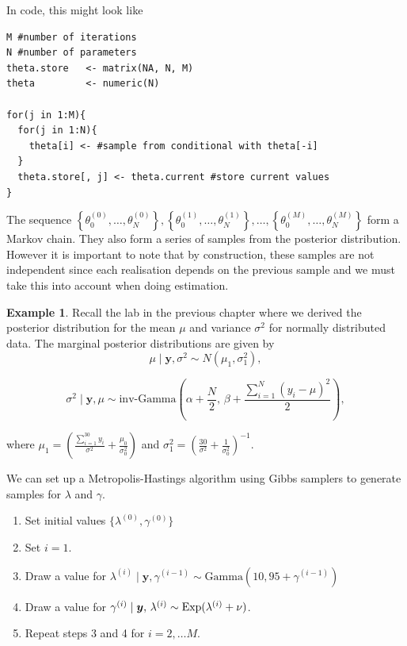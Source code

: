 \documentclass[
]{book}
\theoremstyle{definition}
\theoremstyle{definition}
\newtheorem{example}{Example}[chapter]
\theoremstyle{definition}
\theoremstyle{definition}
\theoremstyle{remark}
\begin{document}
In code, this might look like

\begin{verbatim}
M #number of iterations
N #number of parameters
theta.store   <- matrix(NA, N, M)
theta         <- numeric(N)

for(j in 1:M){
  for(j in 1:N){
    theta[i] <- #sample from conditional with theta[-i]
  }
  theta.store[, j] <- theta.current #store current values
}
\end{verbatim}

The sequence \(\left\{\theta_0^{(0)},\ldots, \theta_N^{(0)}\right\}, \left\{\theta_0^{(1)},\ldots, \theta_N^{(1)}\right\}, \ldots, \left\{\theta_0^{(M)},\ldots, \theta_N^{(M)}\right\}\) form a Markov chain. They also form a series of samples from the posterior distribution. However it is important to note that by construction, these samples are not independent since each realisation depends on the previous sample and we must take this into account when doing estimation.

\begin{example}

Recall the lab in the previous chapter where we derived the posterior distribution for the mean \(\mu\) and variance \(\sigma^2\) for normally distributed data. The marginal posterior distributions are given by
\[
\mu \mid \boldsymbol{y}, \sigma^2 \sim N(\mu_1, \sigma^2_1),
\]

\[
\sigma^2 \mid \boldsymbol{y}, \mu \sim \textrm{inv-Gamma}\left(\alpha + \frac{N}{2}, \,\beta + \frac{\sum_{i=1}^N (y_i - \mu)^2}{2}\right),
\]

where \(\mu_1 =\left(\frac{\sum_{i=1}^{30}y_i}{\sigma^2} + \frac{\mu_0}{\sigma_0^2} \right)\) and \(\sigma^2_1 = \left(\frac{30}{\sigma^2} + \frac{1}{\sigma_0^2}\right)^{-1}\).

We can set up a Metropolis-Hastings algorithm using Gibbs samplers to generate samples for \(\lambda\) and \(\gamma\).

\begin{enumerate}
\def\labelenumi{\arabic{enumi}.}
\item
  Set initial values \(\{\lambda^{(0)}, \gamma^{(0)}\}\)
\item
  Set \(i = 1\).
\item
  Draw a value for \(\lambda^{(i)} \mid \boldsymbol{y}, \gamma^{(i-1)} \sim \textrm{Gamma}(10, 95 + \gamma^{(i-1)})\)
\item
  Draw a value for \(\gamma^{(i)} \mid \boldsymbol{y}, \,\lambda^{(i)} \sim \hbox{Exp}(\lambda^{(i)} + \nu)\).
\item
  Repeat steps 3 and 4 for \(i = 2, \ldots M\).
\end{enumerate}

\end{example}
\end{document}
